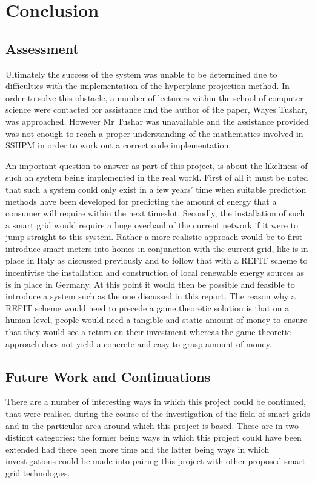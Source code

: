 \documentclass[a4paper, notitlepage]{report}
\begin{document}
\part{Conclusion}
\label{sec:org084f285}
\chapter{Assessment}
\label{sec:orgdc08272}
Ultimately the success of the system was unable to be determined due to
difficulties with the implementation of the hyperplane projection method. In
order to solve this obstacle, a number of lecturers within the school of
computer science were contacted for assistance and the author of the paper,
Wayes Tushar, was approached. However Mr Tushar was unavailable and the
assistance provided was not enough to reach a proper understanding of the
mathematics involved in SSHPM in order to work out a correct code
implementation.

An important question to answer as part of this project, is about the likeliness
of such an system being implemented in the real world. First of all it must be
noted that such a system could only exist in a few years' time when suitable
prediction methods have been developed for predicting the amount of energy that
a consumer will require within the next timeslot. Secondly, the installation of
such a smart grid would require a huge overhaul of the current network if it
were to jump straight to this system. Rather a more realistic approach would be
to first introduce smart meters into homes in conjunction with the current grid,
like is in place in Italy as discussed previously and to follow that with a
REFIT scheme to incentivise the installation and construction of local renewable
energy sources as is in place in Germany. At this point it would then be
possible and feasible to introduce a system such as the one discussed in this
report. The reason why a REFIT scheme would need to precede a game theoretic
solution is that on a human level, people would need a tangible and static
amount of money to ensure that they would see a return on their investment
whereas the game theoretic approach does not yield a concrete and easy to grasp
amount of money.
\chapter{Future Work and Continuations}
\label{sec:orgb2932cb}
There are a number of interesting ways in which this project could be continued,
that were realised during the course of the investigation of the field of smart
grids and in the particular area around which this project is based. These are
in two distinct categories: the former being ways in which this project could
have been extended had there been more time and the latter being ways in which
investigations could be made into pairing this project with other proposed smart
grid technologies. 
\end{document}
